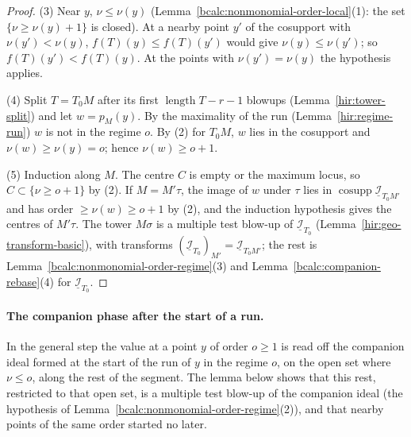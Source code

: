 \begin{proof}
(3) Near \(y\), \(\nu\le\nu(y)\) (Lemma~\ref{bcalc:nonmonomial-order-local}(1): the set \(\{\nu\ge\nu(y)+1\}\) is closed). At a nearby point \(y'\) of the cosupport
with \(\nu(y')<\nu(y)\), \(f(T)(y)\le f(T)(y')\) would give \(\nu(y)\le\nu(y')\); so \(f(T)(y')<f(T)(y)\). At the points with \(\nu(y')=\nu(y)\) the hypothesis
applies.

(4) Split \(T=T_0M\) after its first \(\operatorname{length}T-r-1\) blowups (Lemma~\ref{hir:tower-split}) and let \(w=p_M(y)\). By the maximality of the run
(Lemma~\ref{hir:regime-run}) \(w\) is not in the regime \(o\). By (2) for \(T_0M\), \(w\) lies in the cosupport and \(\nu(w)\ge\nu(y)=o\); hence \(\nu(w)\ge o+1\).

(5) Induction along \(M\). The centre \(C\) is empty or the maximum locus, so \(C\subset\{\nu\ge o+1\}\) by (2). If \(M=M'\tau\), the image of \(w\) under \(\tau\)
lies in \(\operatorname{cosupp}\underline{\mathcal I}_{T_0M'}\) and has order \(\ge\nu(w)\ge o+1\) by (2), and the induction hypothesis gives the centres of \(M'\tau\).
The tower \(M\sigma\) is a multiple test blow-up of \(\underline{\mathcal I}_{T_0}\) (Lemma~\ref{hir:geo-transform-basic}), with transforms
\((\underline{\mathcal I}_{T_0})_{M'}=\underline{\mathcal I}_{T_0M'}\); the rest is Lemma~\ref{bcalc:nonmonomial-order-regime}(3) and
Lemma~\ref{bcalc:companion-rebase}(4) for \(\underline{\mathcal I}_{T_0}\).
\end{proof}

\paragraph{The companion phase after the start of a run.} In the general step the value at a point \(y\) of order \(o\ge1\) is read off the
companion ideal formed at the start of the run of \(y\) in the regime \(o\), on the open set where \(\nu\le o\), along the rest of the segment. The lemma
below shows that this rest, restricted to that open set, is a multiple test blow-up of the companion ideal (the hypothesis of
Lemma~\ref{bcalc:nonmonomial-order-regime}(2)), and that nearby points of the same order started no later.

